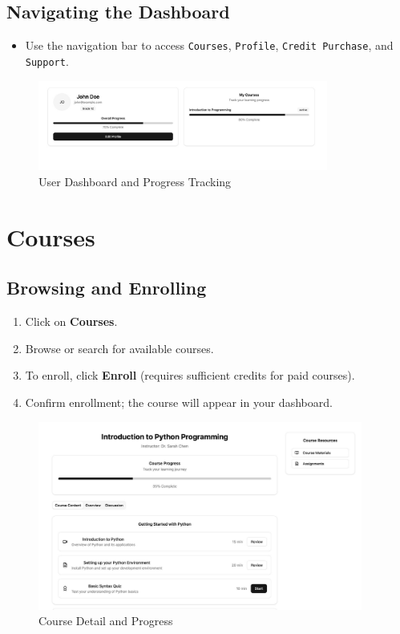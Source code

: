 \documentclass[a4paper,11pt]{scrartcl}
\begin{document}
\subsection{Navigating the Dashboard}
\begin{itemize}[leftmargin=*]
    \item Use the navigation bar to access \texttt{Courses}, \texttt{Profile}, \texttt{Credit Purchase}, and \texttt{Support}.
\end{itemize}
\begin{figure}[H]
    \centering
    \includegraphics[width=0.85\textwidth]{StudentProfile.jpg}
    \caption{User Dashboard and Progress Tracking}
\end{figure}

\section{Courses}

\subsection{Browsing and Enrolling}
\begin{enumerate}[leftmargin=*]
    \item Click on \textbf{Courses}.
    \item Browse or search for available courses.
    \item To enroll, click \textbf{Enroll} (requires sufficient credits for paid courses).
    \item Confirm enrollment; the course will appear in your dashboard.
\end{enumerate}
\begin{figure}[H]
    \centering
    \includegraphics[width=0.95\textwidth]{CourseDetail.jpg}
    \caption{Course Detail and Progress}
\end{figure}
\end{document}
